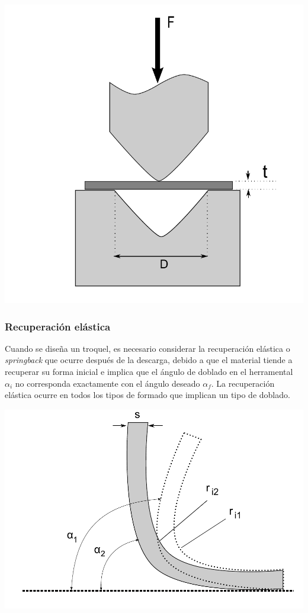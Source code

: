 \begin{center}
\includegraphics[scale=0.425]{src/ch2/fuerza_doblado}
\label{fig:fuerza_doblado}
\end{center}


\subsubsection{Recuperación elástica}

Cuando se diseña un troquel, es necesario considerar la recuperación elástica o \textit{springback} 
que ocurre después de la descarga, debido a que el material tiende a recuperar su forma 
inicial e implica que el ángulo de doblado en el herramental $\alpha_i$ no corresponda exactamente con el 
ángulo deseado $\alpha_f$. La recuperación elástica ocurre en todos los tipos de formado 
que implican un tipo de doblado.\\

\begin{center}
\includegraphics[scale=0.4]{src/ch2/springback}
\label{fig:springback}
\end{center}

